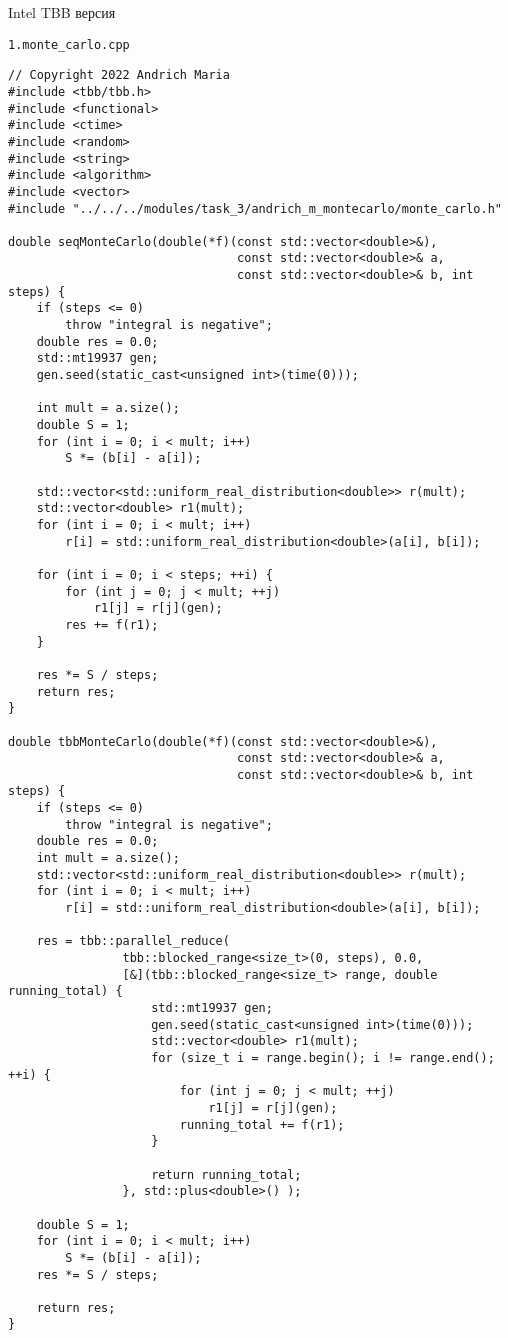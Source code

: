 \documentclass{report}
\begin{document}
\par Intel TBB версия
\par \verb|1.monte_carlo.cpp|
\begin{lstlisting}
// Copyright 2022 Andrich Maria
#include <tbb/tbb.h>
#include <functional>
#include <ctime>
#include <random>
#include <string>
#include <algorithm>
#include <vector>
#include "../../../modules/task_3/andrich_m_montecarlo/monte_carlo.h"

double seqMonteCarlo(double(*f)(const std::vector<double>&),
                                const std::vector<double>& a,
                                const std::vector<double>& b, int steps) {
    if (steps <= 0)
        throw "integral is negative";
    double res = 0.0;
    std::mt19937 gen;
    gen.seed(static_cast<unsigned int>(time(0)));

    int mult = a.size();
    double S = 1;
    for (int i = 0; i < mult; i++)
        S *= (b[i] - a[i]);

    std::vector<std::uniform_real_distribution<double>> r(mult);
    std::vector<double> r1(mult);
    for (int i = 0; i < mult; i++)
        r[i] = std::uniform_real_distribution<double>(a[i], b[i]);

    for (int i = 0; i < steps; ++i) {
        for (int j = 0; j < mult; ++j)
            r1[j] = r[j](gen);
        res += f(r1);
    }

    res *= S / steps;
    return res;
}

double tbbMonteCarlo(double(*f)(const std::vector<double>&),
                                const std::vector<double>& a,
                                const std::vector<double>& b, int steps) {
    if (steps <= 0)
        throw "integral is negative";
    double res = 0.0;
    int mult = a.size();
    std::vector<std::uniform_real_distribution<double>> r(mult);
    for (int i = 0; i < mult; i++)
        r[i] = std::uniform_real_distribution<double>(a[i], b[i]);

    res = tbb::parallel_reduce(
                tbb::blocked_range<size_t>(0, steps), 0.0,
                [&](tbb::blocked_range<size_t> range, double running_total) {
                    std::mt19937 gen;
                    gen.seed(static_cast<unsigned int>(time(0)));
                    std::vector<double> r1(mult);
                    for (size_t i = range.begin(); i != range.end(); ++i) {
                        for (int j = 0; j < mult; ++j)
                            r1[j] = r[j](gen);
                        running_total += f(r1);
                    }

                    return running_total;
                }, std::plus<double>() );

    double S = 1;
    for (int i = 0; i < mult; i++)
        S *= (b[i] - a[i]);
    res *= S / steps;

    return res;
}
\end{lstlisting}
\end{document}

